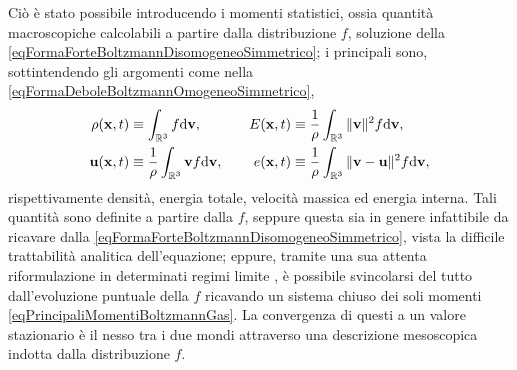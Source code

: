       Ciò è stato possibile introducendo i momenti statistici, ossia quantità macroscopiche calcolabili a partire dalla distribuzione \(f\), soluzione della \eqref{eqFormaForteBoltzmannDisomogeneoSimmetrico}; i principali sono, sottintendendo gli argomenti come nella \ref{eqFormaDeboleBoltzmannOmogeneoSimmetrico},
      \begin{equation}
        \label{eqPrincipaliMomentiBoltzmannGas}
        \def\hsep{\hspace{1em}}
        \begin{aligned}
          \rho(\mathbf x,t)&\equiv\int_{\mathbb R^3}f\de\mathbf v,
          \hsep&E(\mathbf x,t)&\equiv\frac1\rho\int_{\mathbb R^3}\Vert\mathbf v\Vert^2f\de\mathbf v,\\
          \mathbf u(\mathbf x,t)&\equiv\frac1\rho\int_{\mathbb R^3}\mathbf vf\de\mathbf v,
          \hsep&e(\mathbf x,t)&\equiv\frac1\rho\int_{\mathbb R^3}
          \Vert\mathbf v-\mathbf u\Vert^2f\de\mathbf v,\\
        \end{aligned}
      \end{equation}
      rispettivamente densità, energia totale, velocità massica ed energia interna\footnotemark{}. Tali quantità sono definite a partire dalla \(f\), seppure questa sia in genere infattibile da ricavare dalla \eqref{eqFormaForteBoltzmannDisomogeneoSimmetrico}, vista la difficile trattabilità analitica dell'equazione; eppure, tramite una sua attenta riformulazione in determinati regimi limite \cite{Loy2025EKTMAS,PareschiIMS2013}, è possibile svincolarsi del tutto dall'evoluzione puntuale della \(f\) ricavando un sistema chiuso dei soli momenti \eqref{eqPrincipaliMomentiBoltzmannGas}. La convergenza di questi a un valore stazionario è il nesso tra i due mondi attraverso una descrizione mesoscopica indotta dalla distribuzione \(f\).%

